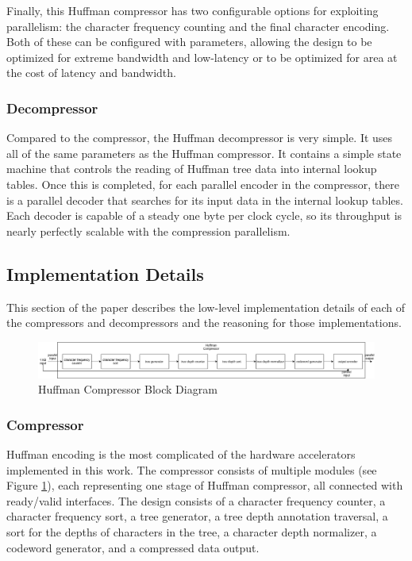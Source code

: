 \documentclass[doublespace,nopageskip]{VTthesis}
\begin{document}
Finally, this Huffman compressor has two configurable options for exploiting parallelism: the character frequency counting and the final character encoding. Both of these can be configured with parameters, allowing the design to be optimized for extreme bandwidth and low-latency or to be optimized for area at the cost of latency and bandwidth.

\subsubsection{Decompressor}\label{sss:huffman_decompressor_design}
Compared to the compressor, the Huffman decompressor is very simple. It uses all of the same parameters as the Huffman compressor. It contains a simple state machine that controls the reading of Huffman tree data into internal lookup tables. Once this is completed, for each parallel encoder in the compressor, there is a parallel decoder that searches for its input data in the internal lookup tables. Each decoder is capable of a steady one byte per clock cycle, so its throughput is nearly perfectly scalable with the compression parallelism.

\subsection{Implementation Details}\label{se:huffman_implementation_details}
This section of the paper describes the low-level implementation details of each of the compressors and decompressors and the reasoning for those implementations.

\begin{figure}[htb]
	\centering
	\includegraphics[scale=0.33]{Huffman Compressor Block Diagram.png}
	\caption{Huffman Compressor Block Diagram}
	\label{fig:huffman_compressor_block_diagram}
\end{figure}

\subsubsection{Compressor}\label{sss:huffman_compressor_implementation}
Huffman encoding is the most complicated of the hardware accelerators implemented in this work. The compressor consists of multiple modules (see Figure \ref{fig:huffman_compressor_block_diagram}), each representing one stage of Huffman compressor, all connected with ready/valid interfaces. The design consists of a character frequency counter, a character frequency sort, a tree generator, a tree depth annotation traversal, a sort for the depths of characters in the tree, a character depth normalizer, a codeword generator, and a compressed data output.
\end{document}
